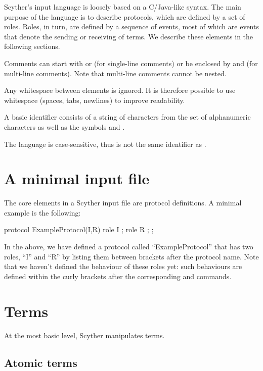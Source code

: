 \documentclass{book}
\begin{document}
Scyther's input language is loosely based on a C/Java-like syntax.
The main purpose of the language is to describe protocols, which are defined by a set of
roles. Roles, in turn, are defined by a sequence of events, most of
which are events that denote the sending or receiving of terms. We describe
these elements in the following sections.

Comments can start with \spd{//} or \spd{\#} (for single-line comments) or
be enclosed by \spd{/*} and \spd{*/} (for multi-line comments). Note that 
multi-line comments cannot be nested.

Any whitespace between elements is ignored. It is
therefore possible to use whitespace (spaces, tabs, newlines) to
improve readability.

A basic identifier consists of a string of characters from
the set of alphanumeric characters as well as the symbols
\spd{\^{}} and \spd{-}.

The language is case-sensitive, thus  is not the same
identifier as .

\section{A minimal input file}

The core elements in a Scyther input file are protocol definitions. A
minimal example is the following:
\begin{spdl}
protocol ExampleProtocol(I,R) {
  role I { };
  role R { };
};
\end{spdl}
In the above, we have defined a protocol called ``ExampleProtocol'' that
has two roles, ``I'' and ``R'' by listing them between brackets after
the protocol name. Note that we haven't defined the
behaviour of these roles
yet: such behaviours are defined within the curly brackets after the
corresponding  and  commands.


\section{Terms}

At the most basic level, Scyther manipulates terms. 

\subsection{Atomic terms}
\end{document}
